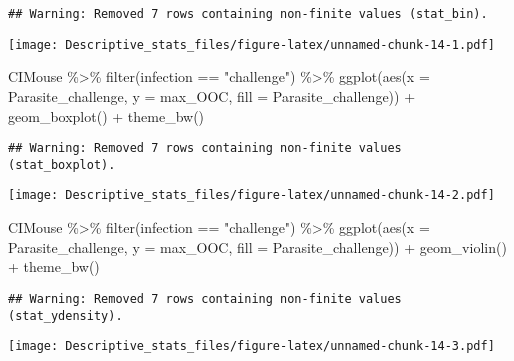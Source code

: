 \documentclass[
]{article}
\newenvironment{Shaded}{\begin{snugshade}}{\end{snugshade}}
\newcommand{\AttributeTok}[1]{\textcolor[rgb]{0.77,0.63,0.00}{#1}}
\newcommand{\FunctionTok}[1]{\textcolor[rgb]{0.00,0.00,0.00}{#1}}
\newcommand{\NormalTok}[1]{#1}
\newcommand{\SpecialCharTok}[1]{\textcolor[rgb]{0.00,0.00,0.00}{#1}}
\newcommand{\StringTok}[1]{\textcolor[rgb]{0.31,0.60,0.02}{#1}}
\begin{document}
\begin{verbatim}
## Warning: Removed 7 rows containing non-finite values (stat_bin).
\end{verbatim}

\texttt{[image: Descriptive\_stats\_files/figure-latex/unnamed-chunk-14-1.pdf]}

\begin{Shaded}
\begin{Highlighting}[]
\NormalTok{CIMouse  }\SpecialCharTok{\%\textgreater{}\%}
    \FunctionTok{filter}\NormalTok{(infection }\SpecialCharTok{==} \StringTok{"challenge"}\NormalTok{)  }\SpecialCharTok{\%\textgreater{}\%}
  \FunctionTok{ggplot}\NormalTok{(}\FunctionTok{aes}\NormalTok{(}\AttributeTok{x =}\NormalTok{ Parasite\_challenge, }\AttributeTok{y =}\NormalTok{ max\_OOC, }\AttributeTok{fill =}\NormalTok{ Parasite\_challenge)) }\SpecialCharTok{+}
  \FunctionTok{geom\_boxplot}\NormalTok{() }\SpecialCharTok{+}
    \FunctionTok{theme\_bw}\NormalTok{()}
\end{Highlighting}
\end{Shaded}

\begin{verbatim}
## Warning: Removed 7 rows containing non-finite values (stat_boxplot).
\end{verbatim}

\texttt{[image: Descriptive\_stats\_files/figure-latex/unnamed-chunk-14-2.pdf]}

\begin{Shaded}
\begin{Highlighting}[]
\NormalTok{CIMouse  }\SpecialCharTok{\%\textgreater{}\%}
    \FunctionTok{filter}\NormalTok{(infection }\SpecialCharTok{==} \StringTok{"challenge"}\NormalTok{)  }\SpecialCharTok{\%\textgreater{}\%}
  \FunctionTok{ggplot}\NormalTok{(}\FunctionTok{aes}\NormalTok{(}\AttributeTok{x =}\NormalTok{ Parasite\_challenge, }\AttributeTok{y =}\NormalTok{ max\_OOC, }\AttributeTok{fill =}\NormalTok{ Parasite\_challenge)) }\SpecialCharTok{+}
  \FunctionTok{geom\_violin}\NormalTok{() }\SpecialCharTok{+}
    \FunctionTok{theme\_bw}\NormalTok{() }
\end{Highlighting}
\end{Shaded}

\begin{verbatim}
## Warning: Removed 7 rows containing non-finite values (stat_ydensity).
\end{verbatim}

\texttt{[image: Descriptive\_stats\_files/figure-latex/unnamed-chunk-14-3.pdf]}
\end{document}
